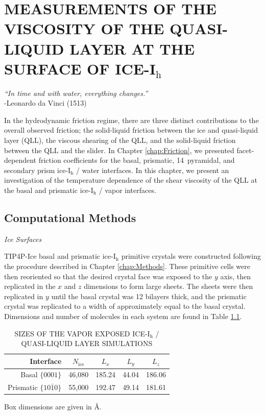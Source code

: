 \chapter{MEASUREMENTS OF THE VISCOSITY OF THE QUASI-LIQUID LAYER AT THE SURFACE OF ICE-I$_\mathrm{h}$}\label{chap:QLL}

\begin{flushright}
\textit{``In time and with water, everything changes.''} \\
-Leonardo da Vinci (1513) \\
\end{flushright}

In the hydrodynamic friction regime, there are three distinct
contributions to the overall observed friction; the solid-liquid
friction between the ice and quasi-liquid layer (QLL), the viscous
shearing of the QLL, and the solid-liquid friction between the QLL and
the slider.\cite{Kietzig2009,Kietzig2010} In Chapter
\ref{chap:Friction}, we presented facet-dependent friction
coefficients for the basal, prismatic, 14\degree~pyramidal, and
secondary prism ice-I$_\mathrm{h}$ / water interfaces. In this
chapter, we present an investigation of the temperature dependence of
the shear viscosity of the QLL at the basal and prismatic
ice-I$_\mathrm{h}$ / vapor interfaces.



\section{Computational Methods}

\begin{flushleft}
\textit{Ice Surfaces}
\end{flushleft}

TIP4P-Ice basal and prismatic ice-I$_\mathrm{h}$ primitive crystals
were constructed following the procedure described in Chapter
\ref{chap:Methods}. These primitive cells were then reoriented so that
the desired crystal face was exposed to the $y$ axis, then replicated
in the $x$ and $z$ dimensions to form large sheets. The sheets were
then replicated in $y$ until the basal crystal was 12 bilayers thick,
and the prismatic crystal was replicated to a width of approximately
equal to the basal crystal. Dimensions and number of molecules in each
system are found in Table \ref{tab:qll-method}.


\begin{table}[h]
\centering
\caption{SIZES OF THE VAPOR EXPOSED ICE-I$_\mathrm{h}$ / QUASI-LIQUID LAYER SIMULATIONS\label{tab:qll-method}}
\begin{tabular}{rcccc}
\hline
\hline
 Interface & $N_\mathrm{ice}$ & $L_x$ & $L_y$ & $L_z$ \\
\hline
Basal  $\{0001\}$                           & 46,080 & 185.24 & 44.04 & 186.06 \\
Prismatic  $\{10\bar{1}0\}$            & 55,000 & 192.47 & 49.14 & 181.61\\
\hline
\hline
\end{tabular}
\begin{flushleft}
Box dimensions are given in \AA.
\end{flushleft}
\end{table}


